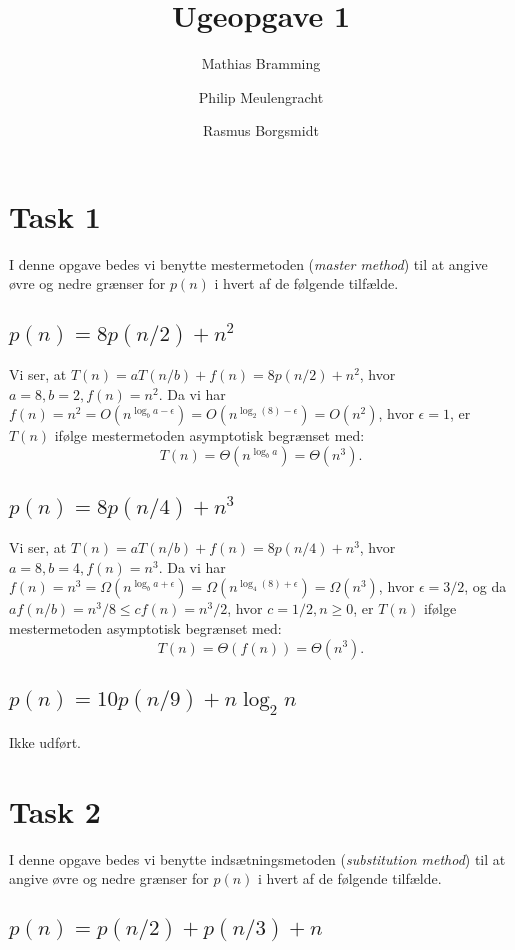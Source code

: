 \documentclass[paper=a4, fleqn]{article}
\title{Ugeopgave 1}
\author{Mathias Bramming \and Philip Meulengracht \and Rasmus Borgsmidt}
\date{}
\begin{document}
\maketitle
\section*{Task 1}
I denne opgave bedes vi benytte mestermetoden ({\em master method}) til at
angive øvre og nedre grænser for $p(n)$ i hvert af de følgende tilfælde.

\subsection*{$p(n)=8p(n/2)+n^2$}

Vi ser, at $T(n)=aT(n/b)+f(n)=8p(n/2)+n^2$, hvor $a=8, b=2, f(n)=n^2$. Da vi
har $f(n)=n^2=O(n^{\log_b a-\epsilon})=O(n^{\log_2(8)-\epsilon})=O(n^2)$, hvor
$\epsilon=1$, er $T(n)$ ifølge mestermetoden asymptotisk begrænset med:
\[
T(n)=\Theta(n^{\log_b a})=\Theta(n^3).
\]

\subsection*{$p(n)=8p(n/4)+n^3$}

Vi ser, at $T(n)=aT(n/b)+f(n)=8p(n/4)+n^3$, hvor $a=8, b=4, f(n)=n^3$. Da vi har
$f(n)=n^3=\Omega(n^{\log_b
  a+\epsilon})=\Omega(n^{\log_4(8)+\epsilon})=\Omega(n^3)$, hvor $\epsilon=3/2$,
og da $af(n/b)=n^3/8\leq cf(n)=n^3/2$, hvor $c=1/2, n\geq 0$, er $T(n)$ ifølge
mestermetoden asymptotisk begrænset med:
\[
T(n)=\Theta(f(n))=\Theta(n^3).
\]

\subsection*{$p(n)=10p(n/9)+n\log_2 n$}

Ikke udført.

\section*{Task 2}

I denne opgave bedes vi benytte indsætningsmetoden ({\em substitution method})
til at angive øvre og nedre grænser for $p(n)$ i hvert af de følgende tilfælde.

\subsection*{$p(n)=p(n/2)+p(n/3)+n$}
\end{document}
